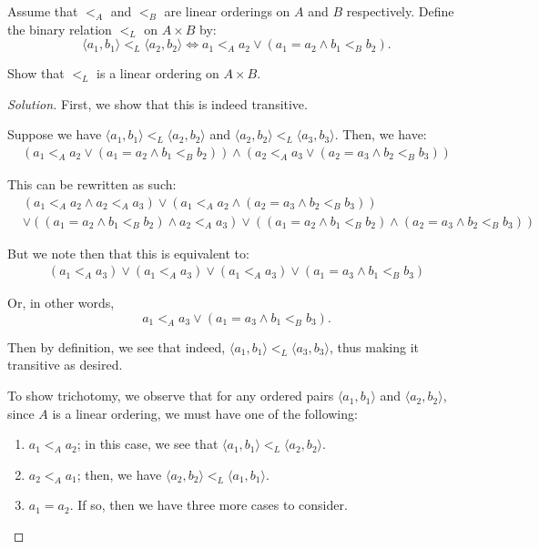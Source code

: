\documentclass{article}
\newenvironment{solution}{\begin{proof}[Solution]}{\end{proof}}
\newcommand{\pr}[1]{\left( {#1} \right)}
\newcommand{\ang}[1]{\langle {#1} \rangle}
\begin{document}
	\begin{hw}{45}
		Assume that $<_{A}$ and $<_{B}$ are linear orderings on $A$ and $B$ respectively. Define the binary relation $<_{L}$ on $A \times B$ by:
		\begin{equation*}
			\ang{a_{1}, b_{1}} <_{L} \ang{a_{2}, b_{2}} \iff a_{1} <_{A} a_{2} \lor \pr{a_{1} = a_{2} \land b_{1} <_{B} b_{2}}. 
		\end{equation*}
	
		Show that $<_{L}$ is a linear ordering on $A\times B$.
	\end{hw}
	\begin{solution}
		First, we show that this is indeed transitive.
		
		Suppose we have $\ang{a_{1}, b_{1}} <_{L} \ang{a_{2}, b_{2}}$ and $\ang{a_{2}, b_{2}} <_{L} \ang{a_{3}, b_{3}}$. Then, we have:
		\begin{align*}
			\pr{a_{1} <_{A} a_{2} \lor \pr{a_{1} = a_{2} \land b_{1} <_{B} b_{2}}} \land \pr{a_{2} <_{A} a_{3} \lor \pr{a_{2} = a_{3} \land b_{2} <_{B} b_{3}}}
		\end{align*}
	
		This can be rewritten as such:
		\begin{align*}
			&\pr{a_{1} <_{A} a_{2} \land a_{2} <_{A} a_{3}} \lor \pr{a_{1} <_{A} a_{2} \land \pr{a_{2} = a_{3} \land b_{2} <_{B} b_{3}}} \\ 
			&\lor \pr{\pr{a_{1} = a_{2} \land b_{1} <_{B} b_{2}} \land a_{2} <_{A} a_{3}} \lor \pr{\pr{a_{1} = a_{2} \land b_{1} <_{B} b_{2}} \land \pr{a_{2} = a_{3} \land b_{2} <_{B} b_{3}}}
		\end{align*}
	
		But we note then that this is equivalent to:
		\begin{align*}
			\pr{a_{1} <_{A} a_{3}} \lor \pr{a_{1} <_{A} a_{3}} \lor \pr{a_{1} <_{A} a_{3}} \lor \pr{a_{1} = a_{3} \land b_{1} <_{B} b_{3}} 
		\end{align*}
		
		Or, in other words,
		\begin{equation*}
			a_{1} <_{A} a_{3} \lor (a_{1} = a_{3} \land b_{1} <_{B} b_{3}).
		\end{equation*}
	
		Then by definition, we see that indeed, $\ang{a_{1}, b_{1}} <_{L} \ang{a_{3}, b_{3}}$, thus making it transitive as desired.
		
		To show trichotomy, we observe that for any ordered pairs $\ang{a_{1}, b_{1}}$ and $\ang{a_{2}, b_{2}}$, since $A$ is a linear ordering, we must have one of the following:
		\begin{enumerate}
			\item $a_{1} <_{A} a_{2}$; in this case, we see that $\ang{a_{1}, b_{1}} <_{L} \ang{a_{2}, b_{2}}$.
			\item $a_{2} <_{A} a_{1}$; then, we have $\ang{a_{2}, b_{2}} <_{L} \ang{a_{1}, b_{1}}$.
			\item $a_{1} = a_{2}$. If so, then we have three more cases to consider.
		\end{enumerate}
	

\end{solution}
\end{document}
